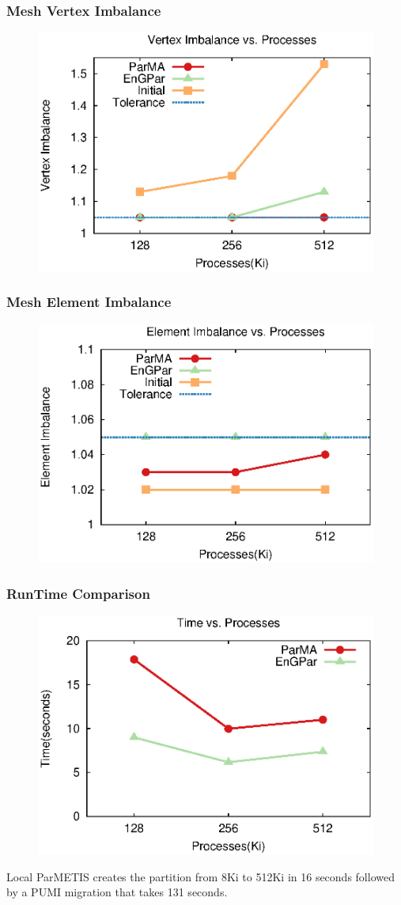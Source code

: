 \documentclass{beamer}
\begin{document}
\begin{frame}
  \frametitle{Mesh Vertex Imbalance}
  \begin{figure}
    \centering
    \includegraphics[width=.8\textwidth]{figures/vimb_v_cores.eps}
  \end{figure}  
\end{frame}

\begin{frame}
  \frametitle{Mesh Element Imbalance}
  \begin{figure}
    \centering
    \includegraphics[width=.8\textwidth]{figures/eimb_v_cores.eps}
  \end{figure}  
\end{frame}

\begin{frame}
  \frametitle{RunTime Comparison}
  \begin{figure}
    \centering
    \includegraphics[width=.5\textwidth]{figures/time_v_cores.eps}
  \end{figure}
  Local ParMETIS creates the partition from 8Ki to 512Ki in 16 seconds followed by a PUMI migration that takes 131 seconds.
  
\end{frame}
\end{document}
